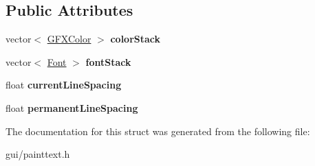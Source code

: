 \subsection*{Public Attributes}
\begin{DoxyCompactItemize}
\item 
vector$<$ \hyperlink{structGFXColor}{G\+F\+X\+Color} $>$ {\bfseries color\+Stack}\hypertarget{structPaintText_1_1LayoutState_ae47c08ce3927095f686aba291f37173c}{}\label{structPaintText_1_1LayoutState_ae47c08ce3927095f686aba291f37173c}

\item 
vector$<$ \hyperlink{classFont}{Font} $>$ {\bfseries font\+Stack}\hypertarget{structPaintText_1_1LayoutState_a7f02c8e02eb990c21982447532bd0910}{}\label{structPaintText_1_1LayoutState_a7f02c8e02eb990c21982447532bd0910}

\item 
float {\bfseries current\+Line\+Spacing}\hypertarget{structPaintText_1_1LayoutState_a1ee1d0f9c3a0df4681cfef6aad1429a8}{}\label{structPaintText_1_1LayoutState_a1ee1d0f9c3a0df4681cfef6aad1429a8}

\item 
float {\bfseries permanent\+Line\+Spacing}\hypertarget{structPaintText_1_1LayoutState_a1c6e057601487237e4ce78c08a57d9e2}{}\label{structPaintText_1_1LayoutState_a1c6e057601487237e4ce78c08a57d9e2}

\end{DoxyCompactItemize}


The documentation for this struct was generated from the following file\+:\begin{DoxyCompactItemize}
\item 
gui/painttext.\+h\end{DoxyCompactItemize}
